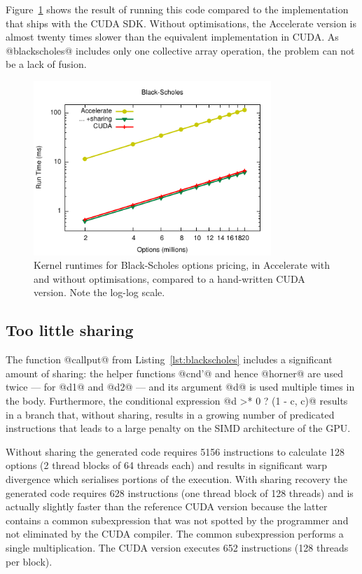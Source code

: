 Figure~\ref{fig:blackscholes} shows the result of running this code compared to
the implementation that ships with the CUDA SDK. Without optimisations, the
Accelerate version is almost twenty times slower than the equivalent
implementation in CUDA\@. As @blackscholes@ includes only one collective array
operation, the problem can not be a lack of fusion.

\begin{figure}
    \begin{center}
        \includegraphics[width=0.8\textwidth]{images/results/black-scholes/black-scholes}
    \end{center}
    \caption[Black-Scholes kernel benchmarks]{Kernel runtimes for Black-Scholes
        options pricing, in Accelerate with and without optimisations, compared
        to a hand-written CUDA version. Note the log-log scale.}
    \label{fig:blackscholes}
\end{figure}

\subsection{Too little sharing}

The function @callput@ from Listing~\ref{lst:blackscholes} includes a
significant amount of sharing: the helper functions @cnd'@ and hence
@horner@ are used twice --- for @d1@ and @d2@ --- and its
argument @d@ is used multiple times in the body. Furthermore, the
conditional expression @d >* 0 ? (1 - c, c)@ results in a branch that,
without sharing, results in a growing number of predicated instructions that
leads to a large penalty on the SIMD architecture of the GPU\@.

Without sharing the generated code requires 5156 instructions to calculate 128
options (2 thread blocks of 64 threads each) and results in significant warp
divergence which serialises portions of the execution. With sharing recovery the
generated code requires 628 instructions (one thread block of 128 threads) and
is actually slightly faster than the reference CUDA version because the latter
contains a common subexpression that was not spotted by the programmer and not
eliminated by the CUDA compiler. The common subexpression performs a single
multiplication. The CUDA version executes 652 instructions (128 threads per
block).


